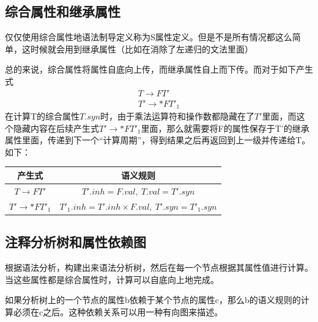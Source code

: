 \documentclass[]{report}
\begin{document}
		\subsection{综合属性和继承属性}
		仅仅使用综合属性地语法制导定义称为S属性定义。但是不是所有情况都这么简单，这时候就会用到继承属性（比如在消除了左递归的文法里面）\par
		总的来说，综合属性将属性自底向上传，而继承属性自上而下传。而对于如下产生式
		\[\begin{gathered}
			T\to FT'\\
			T'\to *FT'_1
		\end{gathered}\]
		在计算T的综合属性$T.syn$时，由于乘法运算符和操作数都隐藏在了$T'$里面，而这个隐藏内容在后续产生式$T'\to*FT'_1$里面，那么就需要将F的属性保存于T'的继承属性里面，传递到下一个“计算周期”，得到结果之后再返回到上一级并传递给T。如下：
		\begin{table}[h!]
			\centering
			\begin{tabular}{cc}
				\toprule
				产生式&语义规则\\
				\midrule
				$T\to FT'$&$T'.inh=F.val,\ T.val=T'.syn$\\
				$T'\to*FT'_1$&$T'_1.inh=T'.inh\times F.val,\ T'.syn=T'_1.syn$\\
				\bottomrule
			\end{tabular}
		\end{table}
		\subsection{注释分析树和属性依赖图}
		根据语法分析，构建出来语法分析树，然后在每一个节点根据其属性值进行计算。当这些属性都是综合属性时，计算可以自底向上地完成。\par
		如果分析树上的一个节点的属性b依赖于某个节点的属性c，那么b的语义规则的计算必须在c之后。这种依赖关系可以用一种有向图来描述。
\end{document}
